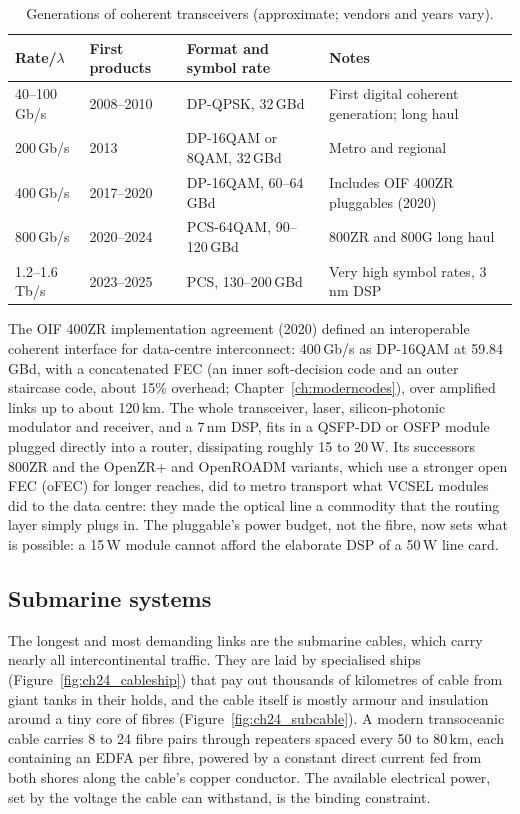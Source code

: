 \begin{table}[htbp]\centering\small
\caption{Generations of coherent transceivers (approximate; vendors and years vary).}
\label{tab:ch24:coherent}
\begin{tabularx}{\linewidth}{@{}l l l X@{}}
\toprule
Rate/$\lambda$ & First products & Format and symbol rate & Notes\\
\midrule
40--100\,Gb/s & 2008--2010 & DP-QPSK, 32\,GBd & First digital coherent generation; long haul\\
200\,Gb/s & 2013 & DP-16QAM or 8QAM, 32\,GBd & Metro and regional\\
400\,Gb/s & 2017--2020 & DP-16QAM, 60--64\,GBd & Includes OIF 400ZR pluggables (2020)\\
800\,Gb/s & 2020--2024 & PCS-64QAM, 90--120\,GBd & 800ZR and 800G long haul\\
1.2--1.6\,Tb/s & 2023--2025 & PCS, 130--200\,GBd & Very high symbol rates, 3\,nm DSP\\
\bottomrule
\end{tabularx}
\end{table}

\begin{inpractice}
The OIF 400ZR implementation agreement (2020) defined an interoperable coherent interface for data-centre
interconnect: 400\,Gb/s as DP-16QAM at 59.84\,GBd, with a concatenated FEC (an inner soft-decision code
and an outer staircase code, about 15\% overhead; Chapter~\ref{ch:moderncodes}), over amplified links up
to about 120\,km. The whole transceiver, laser, silicon-photonic modulator and receiver, and a 7\,nm DSP,
fits in a QSFP-DD or OSFP module plugged directly into a router, dissipating roughly 15 to 20\,W. Its
successors 800ZR and the OpenZR+ and OpenROADM variants, which use a stronger open FEC (oFEC) for longer
reaches, did to metro transport what VCSEL modules did to the data centre: they made the optical line a
commodity that the routing layer simply plugs in. The pluggable's power budget, not the fibre, now sets
what is possible: a 15\,W module cannot afford the elaborate DSP of a 50\,W line card.
\end{inpractice}

\subsection{Submarine systems}

The longest and most demanding links are the submarine cables, which carry nearly all intercontinental
traffic. They are laid by specialised ships (Figure~\ref{fig:ch24_cableship}) that pay out thousands of
kilometres of cable from giant tanks in their holds, and the cable itself is mostly armour and
insulation around a tiny core of fibres (Figure~\ref{fig:ch24_subcable}). A modern transoceanic cable
carries 8 to 24 fibre pairs through repeaters spaced every 50 to 80\,km, each containing an EDFA per
fibre, powered by a constant direct current fed from both shores along the cable's copper conductor.
The available electrical power, set by the voltage the cable can withstand, is the binding constraint.

